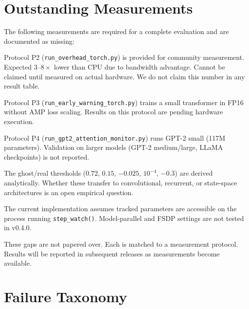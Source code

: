 \documentclass[11pt,a4paper]{article}
\theoremstyle{plain}
\begin{document}

\section{Outstanding Measurements}
\label{sec:missing}

The following measurements are required for a complete evaluation
and are documented as missing:

\begin{description}[leftmargin=*]
\item[GPU overhead.]
  Protocol P2 (\texttt{run\_overhead\_torch.py}) is provided for
  community measurement.
  Expected $3$--$8\times$ lower than CPU due to bandwidth advantage.
  Cannot be claimed until measured on actual hardware.
  We do not claim this number in any result table.

\item[Real training run validation.]
  Protocol P3 (\texttt{run\_early\_warning\_torch.py}) trains a small
  transformer in FP16 without AMP loss scaling.
  Results on this protocol are pending hardware execution.

\item[Large-model validation.]
  Protocol P4 (\texttt{run\_gpt2\_attention\_monitor.py}) runs GPT-2
  small (117M parameters).
  Validation on larger models (GPT-2 medium/large, LLaMA checkpoints)
  is not reported.

\item[Multi-architecture threshold calibration.]
  The ghost/real thresholds ($0.72$, $0.15$, $-0.025$,
  $10^{-4}$, $-0.3$) are derived analytically.
  Whether these transfer to convolutional, recurrent, or state-space
  architectures is an open empirical question.

\item[FSDP/DeepSpeed compatibility.]
  The current implementation assumes tracked parameters are accessible
  on the process running \texttt{step\_watch()}.
  Model-parallel and FSDP settings are not tested in v0.4.0.
\end{description}

These gaps are not papered over.
Each is matched to a measurement protocol.
Results will be reported in subsequent releases as measurements become
available.


\section{Failure Taxonomy}
\label{sec:taxonomy}
\end{document}
